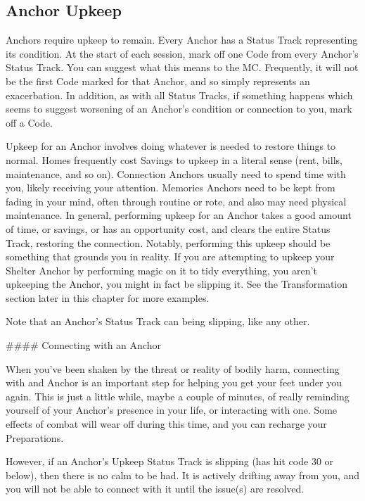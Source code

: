 \documentclass[
  oneside,
  statementpaper,
  9pt]{memoir}
\begin{document}
\hypertarget{anchor-upkeep}{%
\subsection{Anchor Upkeep}\label{anchor-upkeep}}

\begin{Player}

Anchors require upkeep to remain. Every Anchor has a Status Track representing its condition. At the start of each session, mark off one Code from every Anchor’s Status Track. You can suggest what this means to the MC. Frequently, it will not be the first Code marked for that Anchor, and so simply represents an exacerbation. In addition, as with all Status Tracks, if something happens which seems to suggest worsening of an Anchor’s condition or connection to you, mark off a Code.

Upkeep for an Anchor involves doing whatever is needed to restore things to normal. Homes frequently cost Savings to upkeep in a literal sense (rent, bills, maintenance, and so on). Connection Anchors usually need to spend time with you, likely receiving your attention. Memories Anchors need to be kept from fading in your mind, often through routine or rote, and also may need physical maintenance. In general, performing upkeep for an Anchor takes a good amount of time, or savings, or has an opportunity cost, and clears the entire Status Track, restoring the connection. Notably, performing this upkeep should be something that grounds you in reality. If you are attempting to upkeep your Shelter Anchor by performing magic on it to tidy everything, you aren’t upkeeping the Anchor, you might in fact be slipping it. See the Transformation section later in this chapter for more examples.

Note that an Anchor’s Status Track can being slipping, like any other.

#### Connecting with an Anchor

When you’ve been shaken by the threat or reality of bodily harm, connecting with and Anchor is an important step for helping you get your feet under you again. This is just a little while, maybe a couple of minutes, of really reminding yourself of your Anchor’s presence in your life, or interacting with one. Some effects of combat will wear off during this time, and you can recharge your Preparations.

However, if an Anchor’s Upkeep Status Track is slipping (has hit code 30 or below), then there is no calm to be had. It is actively drifting away from you, and you will not be able to connect with it until the issue(s) are resolved.


\end{Player}
\end{document}
